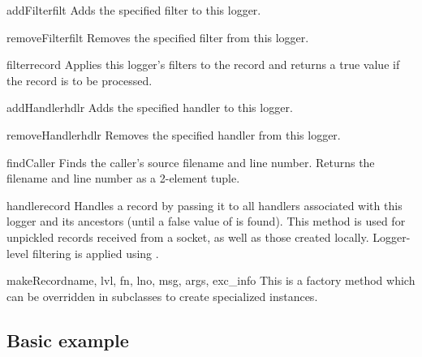 \begin{methoddesc}{addFilter}{filt}
Adds the specified filter  to this logger.
\end{methoddesc}

\begin{methoddesc}{removeFilter}{filt}
Removes the specified filter  from this logger.
\end{methoddesc}

\begin{methoddesc}{filter}{record}
Applies this logger's filters to the record and returns a true value if
the record is to be processed.
\end{methoddesc}

\begin{methoddesc}{addHandler}{hdlr}
Adds the specified handler  to this logger.
\end{methoddesc}

\begin{methoddesc}{removeHandler}{hdlr}
Removes the specified handler  from this logger.
\end{methoddesc}

\begin{methoddesc}{findCaller}{}
Finds the caller's source filename and line number. Returns the filename
and line number as a 2-element tuple.
\end{methoddesc}

\begin{methoddesc}{handle}{record}
Handles a record by passing it to all handlers associated with this logger
and its ancestors (until a false value of  is found).
This method is used for unpickled records received from a socket, as well
as those created locally. Logger-level filtering is applied using
.
\end{methoddesc}

\begin{methoddesc}{makeRecord}{name, lvl, fn, lno, msg, args, exc_info}
This is a factory method which can be overridden in subclasses to create
specialized  instances.
\end{methoddesc}

\subsection{Basic example \label{minimal-example}}


